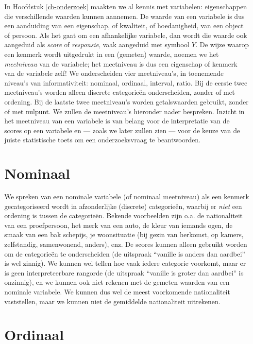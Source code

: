 \documentclass[
]{book}
\begin{document}
In Hoofdstuk \ref{ch-onderzoek} maakten we al kennis met variabelen:
eigenschappen die verschillende waarden kunnen aannemen. De waarde van
een variabele is dus een aanduiding van een eigenschap, of kwaliteit, of
hoedanigheid, van een object of persoon. Als het gaat om een
afhankelijke variabele, dan wordt die waarde ook aangeduid als \emph{score}
of \emph{responsie}, vaak aangeduid met symbool \(Y\). De wijze waarop een
kenmerk wordt uitgedrukt in een (gemeten) waarde, noemen we het
\emph{meetniveau} van de variabele; het meetniveau is dus een eigenschap of
kenmerk van de variabele zelf! We onderscheiden vier meetniveau's, in
toenemende niveau's van informativiteit: nominaal, ordinaal, interval,
ratio. Bij de eerste twee meetniveau's worden alleen discrete
categorieën onderscheiden, zonder of met ordening. Bij de laatste twee
meetniveau's worden getalswaarden gebruikt, zonder of met nulpunt. We
zullen de meetniveau's hieronder nader bespreken. Inzicht in het
meetniveau van een variabele is van belang voor de interpretatie van de
scores op een variabele en --- zoals we later zullen zien --- voor de
keuze van de juiste statistische toets om een onderzoeksvraag te
beantwoorden.

\section{Nominaal}\label{sec:nominaal}

We spreken van een nominale variabele (of nominaal meetniveau) als een
kenmerk gecategoriseerd wordt in afzonderlijke (discrete) categorieën,
waarbij er \emph{niet} een ordening is tussen de categorieën. Bekende
voorbeelden zijn o.a. de nationaliteit van een proefpersoon, het merk
van een auto, de kleur van iemands ogen, de smaak van een bak schepijs,
je woonsituatie (bij gezin van herkomst, op kamers, zelfstandig,
samenwonend, anders), enz. De scores kunnen alleen gebruikt worden om de
categorieën te onderscheiden (de uitspraak ``vanille is anders dan
aardbei'' is wel zinnig). We kunnen wel tellen hoe vaak iedere categorie
voorkomt, maar er is geen interpreteerbare rangorde (de uitspraak ``vanille
is groter dan aardbei'' is onzinnig), en we kunnen ook niet rekenen met
de gemeten waarden van een nominale variabele. We kunnen dus wel de
meest voorkomende nationaliteit vaststellen, maar we kunnen niet de
gemiddelde nationaliteit uitrekenen.

\section{Ordinaal}\label{sec:ordinaal}
\end{document}

